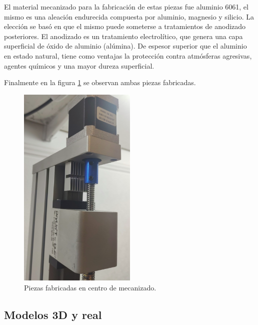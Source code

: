 El material mecanizado para la fabricación de estas piezas fue aluminio 6061, el mismo es una aleación endurecida compuesta por aluminio, magnesio y silicio. La elección se basó en que el mismo puede someterse a tratamientos de anodizado posteriores. El anodizado es un tratamiento electrolítico, que genera una capa superficial de óxido de aluminio (alúmina). De espesor superior que el aluminio en estado natural, tiene como ventajas la protección contra atmósferas agresivas, agentes químicos y una mayor dureza superficial.

Finalmente en la figura \ref{fig:real_custom} se observan ambas piezas fabricadas.

\begin{figure}[h]
	\centering
	\includegraphics[width=0.5\textwidth]{./Figures/real_custom.png}
	\caption{Piezas fabricadas en centro de mecanizado.}
	\label{fig:real_custom}
\end{figure}


\subsection{Modelos 3D y real}

